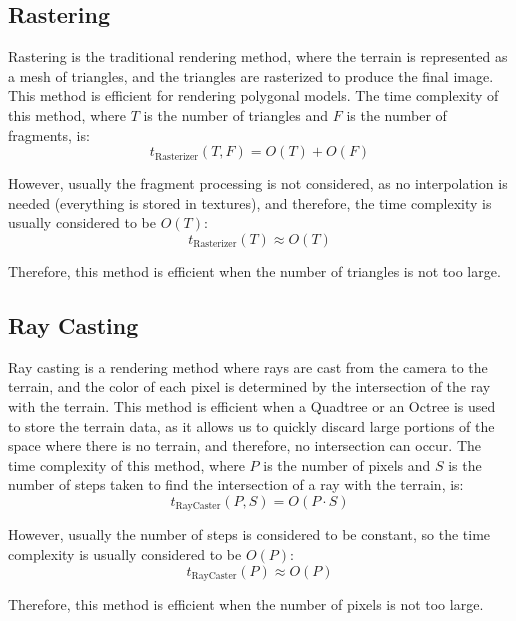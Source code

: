 \subsection{Rastering}

Rastering is the traditional rendering method, where the terrain is represented as a mesh of triangles, and the triangles are rasterized to produce the final image. This method is efficient for rendering polygonal models. The time complexity of this method, where $T$ is the number of triangles and $F$ is the number of fragments, is:
\begin{equation*}
    t_{\text{Rasterizer}}(T, F) = O(T) + O(F)
\end{equation*}

However, usually the fragment processing is not considered, as no interpolation is needed (everything is stored in textures), and therefore, the time complexity is usually considered to be $O(T)$:
\begin{equation*}
    t_{\text{Rasterizer}}(T) \approx O(T)
\end{equation*}

Therefore, this method is efficient when the number of triangles is not too large.

\subsection{Ray Casting}

Ray casting is a rendering method where rays are cast from the camera to the terrain, and the color of each pixel is determined by the intersection of the ray with the terrain. This method is efficient when a Quadtree or an Octree is used to store the terrain data, as it allows us to quickly discard large portions of the space where there is no terrain, and therefore, no intersection can occur. The time complexity of this method, where $P$ is the number of pixels and $S$ is the number of steps taken to find the intersection of a ray with the terrain, is:
\begin{equation*}
    t_{\text{RayCaster}}(P, S) = O(P\cdot S)
\end{equation*}

However, usually the number of steps is considered to be constant, so the time complexity is usually considered to be $O(P)$:
\begin{equation*}
    t_{\text{RayCaster}}(P) \approx O(P)
\end{equation*}

Therefore, this method is efficient when the number of pixels is not too large.

